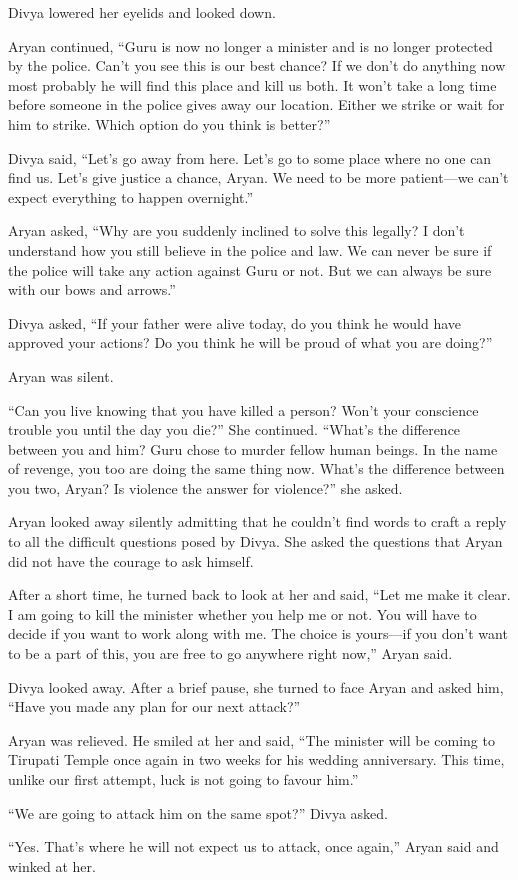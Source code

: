 Divya lowered her eyelids and looked down.

Aryan continued, “Guru is now no longer a minister and is no longer protected by
the police. Can't you see this is our best chance? If we don't do anything now
most probably he will find this place and kill us both. It won't take a long
time before someone in the police gives away our location. Either we strike or
wait for him to strike. Which option do you think is better?”

Divya said, “Let's go away from here. Let's go to some place where no one can
find us. Let's give justice a chance, Aryan. We need to be more patient—we
can't expect everything to happen overnight.”

Aryan asked, “Why are you suddenly inclined to solve this legally? I don't
understand how you still believe in the police and law. We can never be sure if
the police will take any action against Guru or not. But we can always be sure
with our bows and arrows.”

Divya asked, “If your father were alive today, do you think he would have
approved your actions? Do you think he will be proud of what you are doing?”

Aryan was silent.

“Can you live knowing that you have killed a person? Won't your conscience
trouble you until the day you die?” She continued. “What's the difference
between you and him? Guru chose to murder fellow human beings. In the name of
revenge, you too are doing the same thing now. What's the difference between you
two, Aryan? Is violence the answer for violence?” she asked.

Aryan looked away silently admitting that he couldn't find words to craft a
reply to all the difficult questions posed by Divya. She asked the questions
that Aryan did not have the courage to ask himself.

After a short time, he turned back to look at her and said, “Let me make it
clear. I am going to kill the minister whether you help me or not. You will have
to decide if you want to work along with me. The choice is yours—if you don't
want to be a part of this, you are free to go anywhere right now,” Aryan said.

Divya looked away. After a brief pause, she turned to face Aryan and asked him,
“Have you made any plan for our next attack?”

Aryan was relieved. He smiled at her and said, “The minister will be coming to
Tirupati Temple once again in two weeks for his wedding anniversary. This time,
unlike our first attempt, luck is not going to favour him.”

“We are going to attack him on the same spot?” Divya asked.

“Yes. That's where he will not expect us to attack, once again,” Aryan said and
winked at her.